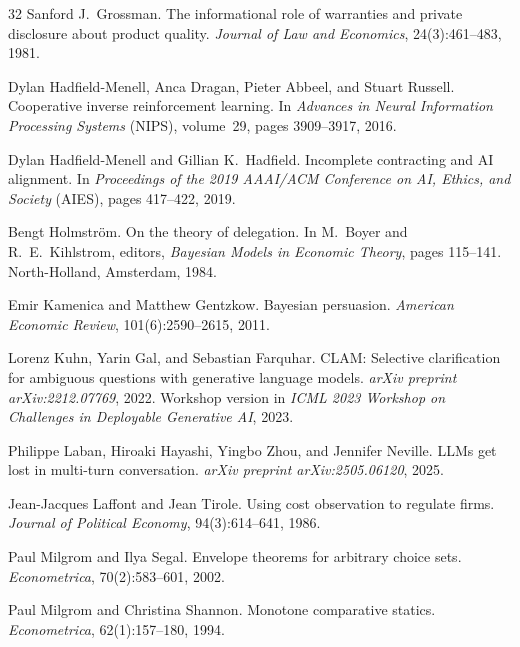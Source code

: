 \documentclass[11pt]{article}
\begin{document}
\begin{thebibliography}{32}
Sanford J.\ Grossman. The informational role of warranties and private
disclosure about product quality. \textit{Journal of Law and Economics},
24(3):461--483, 1981.

Dylan Hadfield-Menell, Anca Dragan, Pieter Abbeel, and Stuart Russell.
Cooperative inverse reinforcement learning.
In \textit{Advances in Neural Information Processing Systems} (NIPS),
volume~29, pages 3909--3917, 2016.

Dylan Hadfield-Menell and Gillian K.\ Hadfield.
Incomplete contracting and AI alignment.
In \textit{Proceedings of the 2019 AAAI/ACM Conference on AI, Ethics, and Society} (AIES),
pages 417--422, 2019.

Bengt Holmstr{\"o}m. On the theory of delegation. In M.~Boyer and R.~E.~Kihlstrom, editors, \textit{Bayesian Models in Economic Theory}, pages 115--141. North-Holland, Amsterdam, 1984.

Emir Kamenica and Matthew Gentzkow. Bayesian persuasion. \textit{American Economic Review}, 101(6):2590--2615, 2011.

Lorenz Kuhn, Yarin Gal, and Sebastian Farquhar.
CLAM: Selective clarification for ambiguous questions with generative language models.
\textit{arXiv preprint arXiv:2212.07769}, 2022. Workshop version in \textit{ICML 2023 Workshop on Challenges in Deployable Generative AI}, 2023.

Philippe Laban, Hiroaki Hayashi, Yingbo Zhou, and Jennifer Neville.
LLMs get lost in multi-turn conversation.
\textit{arXiv preprint arXiv:2505.06120}, 2025.

Jean-Jacques Laffont and Jean Tirole. Using cost observation to regulate firms.
\textit{Journal of Political Economy}, 94(3):614--641, 1986.

Paul Milgrom and Ilya Segal. Envelope theorems for arbitrary choice sets.
\textit{Econometrica}, 70(2):583--601, 2002.

Paul Milgrom and Christina Shannon. Monotone comparative statics.
\textit{Econometrica}, 62(1):157--180, 1994.


\end{thebibliography}
\end{document}

